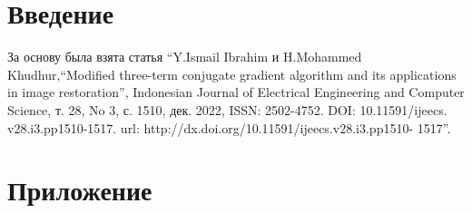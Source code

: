 



\makeatletter
\newcommand{\stackover}{\genfrac{.}{.}\z@{}}
\makeatother




\tableofcontents
\newpage

\section{Введение}

За основу была взята статья ``Y.Ismail Ibrahim и H.Mohammed Khudhur,“Modified
three-term conjugate gradient algorithm and its applications in image
restoration”, Indonesian Journal of Electrical Engineering and Computer Science,
т. 28, No 3, с. 1510, дек. 2022, ISSN: 2502-4752. DOI: 10.11591/ijeecs.
v28.i3.pp1510-1517. url: http://dx.doi.org/10.11591/ijeecs.v28.i3.pp1510- 1517''.

\newpage

\newpage
\nocite{*}
\printbibliography[heading=bibintoc]

\newpage
\section{Приложение}





\newpage





